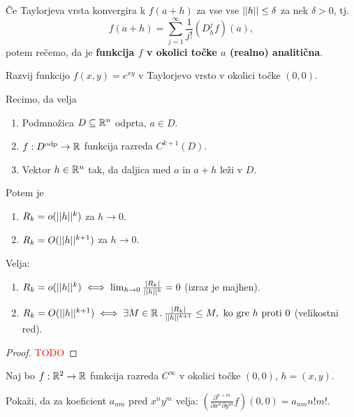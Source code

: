 \begin{definicija}
    Če Taylorjeva vrsta konvergira k $f(a+h)$ za vse vse $||h|| \leq \delta$ za nek $\delta > 0$, tj. 
    $$f(a+h) = \sum_{j=1}^{\infty} \frac{1}{j!} (D_h^j f)(a),$$
    potem rečemo, da je \textbf{funkcija $f$ v okolici točke $a$ (realno) analitična}.
\end{definicija}

\begin{zgled}
    Razvij funkcijo $f(x,y) = e^{xy}$ v Taylorjevo vrsto v okolici točke $(0,0)$.
\end{zgled}

\begin{posledica}
    Recimo, da velja
    \begin{enumerate}
        \item Podmnožica $D \subseteq \mathbb{R}^n$ odprta, $a \in D$.
        \item $f: D^{\text{odp}} \to \mathbb{R}$ funkcija razreda $C^{k+1}(D)$.
        \item Vektor $h \in \mathbb{R}^n$ tak, da daljica med $a$ in $a+h$ leži v $D$.
    \end{enumerate}
    Potem je 
    \begin{enumerate}
        \item $R_k = o(||h||^k)$ za $h \to 0$.
        \item $R_k = O(||h||^{k+1})$ za $h \to 0$.
    \end{enumerate}
\end{posledica}

\begin{opomba}
    Velja:
    \begin{enumerate}
        \item $R_k = o(||h||^k) \iff \lim_{h \to 0} \frac{|R_k|}{||h||^k} = 0$ (izraz je majhen).
        \item $R_k = O(||h||^{k+1}) \iff \exists M \in \mathbb{R} \,.\, \frac{|R_k|}{||h||^{k+1}} \leq M, \text{ ko gre } h \text{ proti } 0$ (velikostni red).
    \end{enumerate}
\end{opomba}

\begin{proof}
    \textcolor{red}{TODO}
\end{proof}

\begin{opomba}
    Naj bo $f: \mathbb{R}^2 \to \mathbb{R}$ funkcija razreda $C^\infty$ v okolici točke $(0,0)$, $h = (x, y)$. 
    
    Pokaži, da za koeficient $a_{nm}$ pred $x^ny^m$ velja: $(\frac{\partial^{n+m}}{\partial x^n \partial y^m} f)(0,0) = a_{nm} n!m!$. 
\end{opomba}

